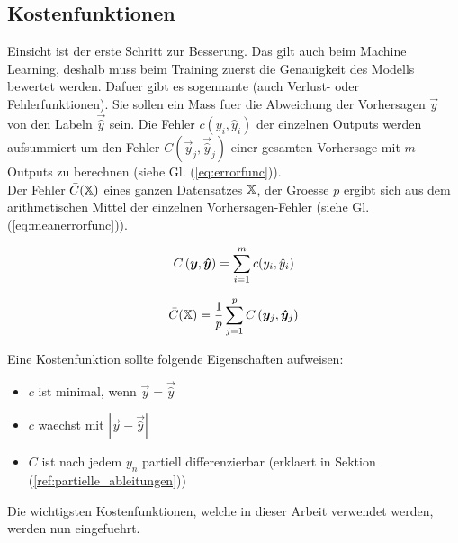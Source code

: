 \subsection{Kostenfunktionen}
Einsicht ist der erste Schritt zur Besserung. Das gilt auch beim Machine Learning, deshalb muss beim Training zuerst die Genauigkeit des Modells bewertet werden.
Dafuer gibt es sogennante  (auch Verlust- oder
Fehlerfunktionen).
Sie sollen ein Mass fuer die Abweichung der Vorhersagen $\vec{y}$ von den Labeln $\vec{\hat{y}}$ sein.
\para{}
Die Fehler $c(y_i,\hat{y}_i)$ der einzelnen Outputs werden aufsummiert um den
Fehler $C(\vec{y}_j,\vec{\hat{y}}_j)$ einer gesamten Vorhersage mit $m$ Outputs
zu berechnen (siehe Gl. (\ref{eq:errorfunc})). \\
Der Fehler $\bar{C}(\mathbb{X})$ eines ganzen Datensatzes $\mathbb{X}$, der
Groesse $p$ ergibt sich aus dem arithmetischen
Mittel der einzelnen Vorhersagen-Fehler (siehe Gl. (\ref{eq:meanerrorfunc})).
\\
\begin{minipage}[h!]{0.5\textwidth}
  \begin{equation}\label{eq:errorfunc}
    C \left(\bm{y},\bm{\hat{y}} \right)=\displaystyle\sum_{i=1}^{m} c(y_i, \hat{y}_i)
  \end{equation}
\end{minipage}
\begin{minipage}[h!]{0.5\textwidth}
  \begin{equation}\label{eq:meanerrorfunc}
    \bar{C}(\mathbb{X}) = \frac{1}{p}\displaystyle\sum_{j=1}^{p} C\left(\bm{y}_j,\bm{\hat{y}}_j\right)
  \end{equation}
\end{minipage}
\para{}
Eine Kostenfunktion sollte folgende Eigenschaften aufweisen:
\begin{itemize}
\item{$c$ ist minimal, wenn $\vec{y} = \vec{\hat{y}}$}
\item{$c$ waechst mit $|\vec{y}-\vec{\hat{y}}|$}
\item{$C$ ist nach jedem $y_n$ partiell differenzierbar (erklaert in Sektion (\ref{ref:partielle_ableitungen}))}
\end{itemize}
\para{}
Die wichtigsten Kostenfunktionen, welche in dieser Arbeit verwendet werden,
werden nun eingefuehrt.

